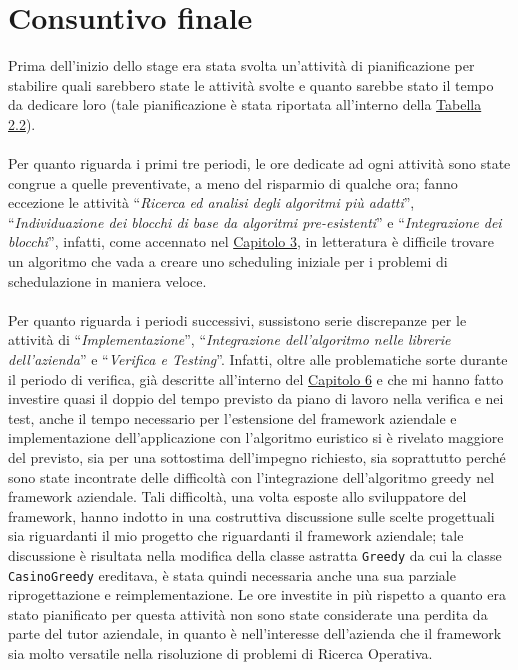 \section{Consuntivo finale}
\label{settetre}
Prima dell'inizio dello stage era stata svolta un'attività di pianificazione per stabilire quali sarebbero state le attività svolte e quanto sarebbe stato il tempo da dedicare loro (tale pianificazione è stata riportata all'interno della \hyperref[tab:pdp]{Tabella 2.2}). \\
\\
Per quanto riguarda i primi tre periodi, le ore dedicate ad ogni attività sono state congrue a quelle preventivate, a meno del risparmio  di qualche ora; fanno eccezione le attività ``\textit{Ricerca ed analisi degli algoritmi più adatti}'', ``\textit{Individuazione dei blocchi di base da algoritmi pre-esistenti}'' e ``\textit{Integrazione dei blocchi}'', infatti, come accennato nel \hyperref[cap:definizione-problema]{Capitolo 3}, in letteratura è difficile trovare un algoritmo che vada a creare uno scheduling iniziale per i problemi di schedulazione in maniera veloce. \\
\\
Per quanto riguarda i periodi successivi, sussistono serie discrepanze per le attività di ``\textit{Implementazione}'', ``\textit{Integrazione dell'algoritmo nelle librerie dell'azienda}'' e ``\textit{Verifica e Testing}''.
Infatti, oltre alle problematiche sorte durante il periodo di verifica, già descritte all'interno del {\hyperref[cap:verifica-validazione]{Capitolo 6}} e che mi hanno fatto investire quasi il doppio del tempo previsto da piano di lavoro nella verifica e nei test, anche il tempo necessario per l'estensione del framework aziendale e implementazione dell'applicazione con l'algoritmo euristico si è rivelato maggiore del previsto, sia 
per una sottostima dell'impegno richiesto, sia soprattutto perché sono state incontrate delle difficoltà con l'integrazione dell'algoritmo greedy nel framework aziendale. Tali difficoltà, una volta esposte allo sviluppatore del framework, hanno indotto in una costruttiva discussione sulle scelte progettuali sia riguardanti il mio progetto che riguardanti il framework aziendale; tale discussione è risultata nella modifica della classe astratta \texttt{Greedy} da cui la classe \texttt{CasinoGreedy} ereditava, è stata quindi necessaria anche una sua parziale riprogettazione e reimplementazione. Le ore investite in più rispetto a quanto era stato pianificato per questa attività non sono state considerate una perdita da parte del tutor aziendale, in quanto è nell'interesse dell'azienda che il framework sia molto versatile nella risoluzione di problemi di Ricerca Operativa.\\
